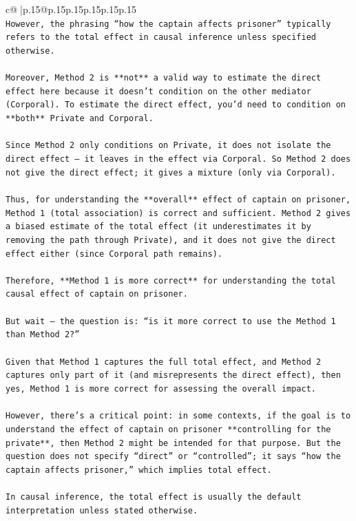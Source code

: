 \documentclass{article}
\begin{document}
{\begin{supertabular}{c@{$\;$}|p{.15\linewidth}@{}p{.15\linewidth}p{.15\linewidth}p{.15\linewidth}p{.15\linewidth}p{.15\linewidth}}
{{{\\ 
\texttt{However, the phrasing “how the captain affects prisoner” typically refers to the total effect in causal inference unless specified otherwise.} \\
\\ 
\texttt{Moreover, Method 2 is **not** a valid way to estimate the direct effect here because it doesn’t condition on the other mediator (Corporal). To estimate the direct effect, you’d need to condition on **both** Private and Corporal.} \\
\\ 
\texttt{Since Method 2 only conditions on Private, it does not isolate the direct effect — it leaves in the effect via Corporal. So Method 2 does not give the direct effect; it gives a mixture (only via Corporal).} \\
\\ 
\texttt{Thus, for understanding the **overall** effect of captain on prisoner, Method 1 (total association) is correct and sufficient. Method 2 gives a biased estimate of the total effect (it underestimates it by removing the path through Private), and it does not give the direct effect either (since Corporal path remains).} \\
\\ 
\texttt{Therefore, **Method 1 is more correct** for understanding the total causal effect of captain on prisoner.} \\
\\ 
\texttt{But wait — the question is: “is it more correct to use the Method 1 than Method 2?”} \\
\\ 
\texttt{Given that Method 1 captures the full total effect, and Method 2 captures only part of it (and misrepresents the direct effect), then yes, Method 1 is more correct for assessing the overall impact.} \\
\\ 
\texttt{However, there’s a critical point: in some contexts, if the goal is to understand the effect of captain on prisoner **controlling for the private**, then Method 2 might be intended for that purpose. But the question does not specify “direct” or “controlled”; it says “how the captain affects prisoner,” which implies total effect.} \\
\\ 
\texttt{In causal inference, the total effect is usually the default interpretation unless stated otherwise.} \\
\\ 
}}}
\end{supertabular}}
\end{document}
